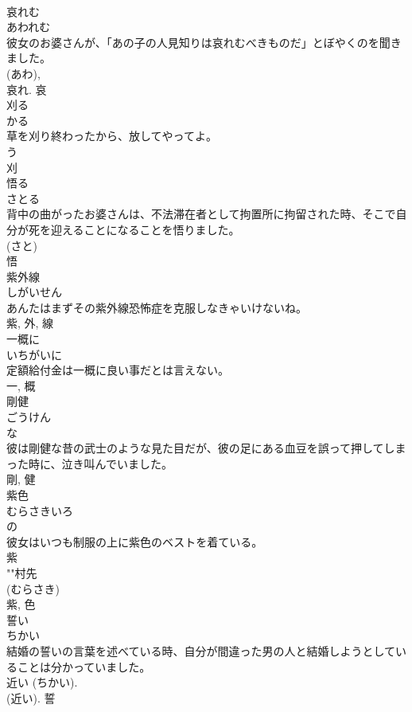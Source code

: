 \documentclass[8pt]{extreport}
\begin{document}
\begin{CJK}{UTF8}{min}
\\	哀れむ	
\\	あわれむ	
\\	彼女のお婆さんが、「あの子の人見知りは哀れむべきものだ」とぼやくのを聞きました。	
\\	(あわ), 
\\	哀れ.	哀	
\\	刈る	
\\	かる	
\\	草を刈り終わったから、放してやってよ。	
\\	う 
\\	刈	
\\	悟る	
\\	さとる	
\\	背中の曲がったお婆さんは、不法滞在者として拘置所に拘留された時、そこで自分が死を迎えることになることを悟りました。	
\\	(さと) 
\\	悟	
\\	紫外線	
\\	しがいせん	
\\	あんたはまずその紫外線恐怖症を克服しなきゃいけないね。	
\\	紫, 外, 線	
\\	一概に	
\\	いちがいに	
\\	定額給付金は一概に良い事だとは言えない。	
\\	一, 概	
\\	剛健	
\\	ごうけん	
\\	な 
\\	彼は剛健な昔の武士のような見た目だが、彼の足にある血豆を誤って押してしまった時に、泣き叫んでいました。	
\\	剛, 健	
\\	紫色	
\\	むらさきいろ	
\\	の 
\\	彼女はいつも制服の上に紫色のベストを着ている。	
\\	紫 
\\	""村先
\\	(むらさき) 
\\	紫, 色	
\\	誓い	
\\	ちかい	
\\	結婚の誓いの言葉を述べている時、自分が間違った男の人と結婚しようとしていることは分かっていました。	
\\	近い (ちかい). 
\\	(近い).	誓	

\end{CJK}
\end{document}
